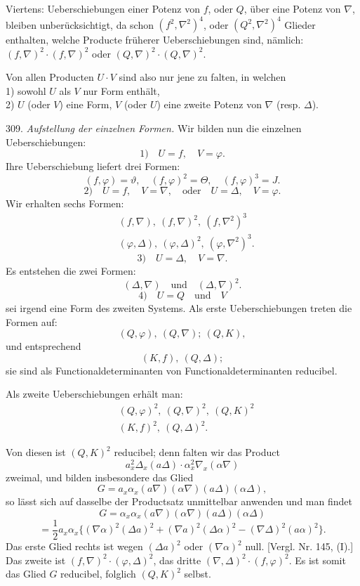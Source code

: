 Viertens: Ueberschiebungen einer Potenz von $f$, oder $Q$, über eine Potenz
von $\nabla$, bleiben unberücksichtigt, da schon $(f^2,\nabla^2)^4$, oder
$(Q^2,\nabla^2)^4$ Glieder enthalten, welche Producte früherer
Ueberschiebungen sind, nämlich: $(f,\nabla)^2\cdot(f,\nabla)^2$ oder
$(Q,\nabla)^2\cdot(Q,\nabla)^2$.

Von allen Producten $U\cdot V$ sind also nur jene zu falten, in welchen\\
1) sowohl $U$ als $V$ nur  Form enthält,\\
2) $U$ (oder $V$) eine Form, $V$ (oder $U$) eine zweite Potenz von
$\nabla$ (resp. $\Delta$).

309. \textit{Aufstellung der einzelnen Formen.} Wir bilden nun die
einzelnen Ueberschiebungen:
\[
1) \quad U = f, \quad V = \varphi.
\]
Ihre Ueberschiebung liefert drei Formen:
\[
(f,\varphi) = \vartheta, \quad (f,\varphi)^2 = \Theta, \quad (f,\varphi)^3 = J.
\]
\[
2) \quad U = f, \quad V = \nabla, \quad \text{oder} \quad U = \Delta, \quad V = \varphi.
\]
Wir erhalten sechs Formen:
\[
\begin{aligned}
&(f,\nabla), \ (f,\nabla)^2, \ (f,\nabla^2)^3\\
&(\varphi,\Delta), \ (\varphi,\Delta)^2, \ (\varphi,\nabla^2)^3.
\end{aligned}
\]
\[
3) \quad U = \Delta, \quad V = \nabla.
\]
Es entstehen die zwei Formen:
\[
(\Delta,\nabla) \quad \text{und} \quad (\Delta,\nabla)^2.
\]
\[
4) \quad U = Q \quad \text{und} \quad V
\]
sei irgend eine Form des zweiten Systems. Als erste Ueberschiebungen
treten die Formen auf:
\[
(Q,\varphi), \ (Q,\nabla); \ (Q,K),
\]
und entsprechend
\[
(K,f), \ (Q,\Delta);
\]
sie sind als Functionaldeterminanten von Functionaldeterminanten
reducibel.

Als zweite Ueberschiebungen erhält man:
\[
\begin{aligned}
&(Q,\varphi)^2, \ (Q,\nabla)^2, \ (Q,K)^2\\
&(K,f)^2, \ (Q,\Delta)^2.
\end{aligned}
\]



Von diesen ist $(Q,K)^2$ reducibel; denn falten wir das Product
\[
a_x^2\Delta_x(a\Delta)\cdot \alpha_x^2\nabla_x(\alpha\nabla)
\]
zweimal, und bilden insbesondere das Glied
\[
G = a_x\alpha_x(a\nabla)(\alpha\nabla)(a\Delta)(\alpha\Delta),
\]
so lässt sich auf dasselbe der Productsatz unmittelbar anwenden und man
findet
\[
G = \alpha_x\alpha_x(a\nabla)(\alpha\nabla)(a\Delta)(\alpha\Delta) %
\]
\[
= \frac{1}{2}a_x\alpha_x\{(\nabla\alpha)^2(\Delta a)^2 + (\nabla a)^2(\Delta\alpha)^2 - (\nabla\Delta)^2(a\alpha)^2\}.
\]
Das erste Glied rechts ist wegen $(\Delta a)^2$ oder $(\nabla\alpha)^2$
null. [Vergl. Nr. 145, (I).] Das zweite ist $(f,\nabla)^2\cdot(\varphi,\Delta)^2$,
das dritte $(\nabla,\Delta)^2\cdot(f,\varphi)^2$. Es ist somit das Glied
$G$ reducibel, folglich $(Q,K)^2$ selbst.

